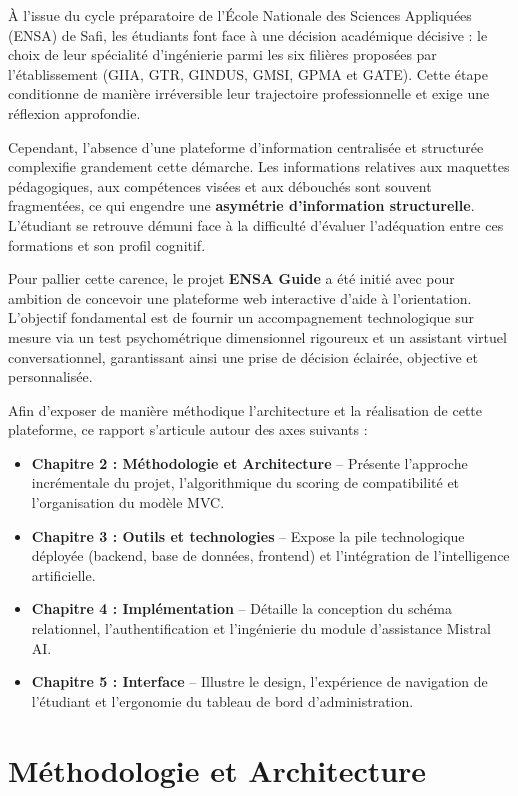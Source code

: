 \documentclass[a4paper,12pt]{article}
\begin{document}
À l'issue du cycle préparatoire de l'École Nationale des Sciences Appliquées (ENSA) de Safi, les étudiants font face à une décision académique décisive : le choix de leur spécialité d'ingénierie parmi les six filières proposées par l'établissement (GIIA, GTR, GINDUS, GMSI, GPMA et GATE). Cette étape conditionne de manière irréversible leur trajectoire professionnelle et exige une réflexion approfondie.

Cependant, l'absence d'une plateforme d'information centralisée et structurée complexifie grandement cette démarche. Les informations relatives aux maquettes pédagogiques, aux compétences visées et aux débouchés sont souvent fragmentées, ce qui engendre une \textbf{asymétrie d'information structurelle}. L'étudiant se retrouve démuni face à la difficulté d'évaluer l'adéquation entre ces formations et son profil cognitif.

Pour pallier cette carence, le projet \textbf{ENSA Guide} a été initié avec pour ambition de concevoir une plateforme web interactive d'aide à l'orientation. L'objectif fondamental est de fournir un accompagnement technologique sur mesure via un test psychométrique dimensionnel rigoureux et un assistant virtuel conversationnel, garantissant ainsi une prise de décision éclairée, objective et personnalisée.

Afin d'exposer de manière méthodique l'architecture et la réalisation de cette plateforme, ce rapport s'articule autour des axes suivants :
\begin{itemize}
    \item \textbf{Chapitre 2 : Méthodologie et Architecture} -- Présente l'approche incrémentale du projet, l'algorithmique du scoring de compatibilité et l'organisation du modèle MVC.
    \item \textbf{Chapitre 3 : Outils et technologies} -- Expose la pile technologique déployée (backend, base de données, frontend) et l'intégration de l'intelligence artificielle.
    \item \textbf{Chapitre 4 : Implémentation} -- Détaille la conception du schéma relationnel, l'authentification et l'ingénierie du module d'assistance Mistral AI.
    \item \textbf{Chapitre 5 : Interface} -- Illustre le design, l'expérience de navigation de l'étudiant et l'ergonomie du tableau de bord d'administration.
\end{itemize}
\clearpage
\section{Méthodologie et Architecture}
\end{document}
